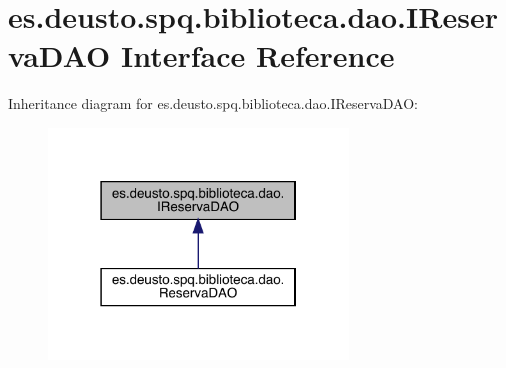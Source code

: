 \hypertarget{interfacees_1_1deusto_1_1spq_1_1biblioteca_1_1dao_1_1_i_reserva_d_a_o}{}\section{es.\+deusto.\+spq.\+biblioteca.\+dao.\+I\+Reserva\+D\+AO Interface Reference}
\label{interfacees_1_1deusto_1_1spq_1_1biblioteca_1_1dao_1_1_i_reserva_d_a_o}


Inheritance diagram for es.\+deusto.\+spq.\+biblioteca.\+dao.\+I\+Reserva\+D\+AO\+:
\nopagebreak
\begin{figure}[H]
\begin{center}
\leavevmode
\includegraphics[width=226pt]{interfacees_1_1deusto_1_1spq_1_1biblioteca_1_1dao_1_1_i_reserva_d_a_o__inherit__graph}
\end{center}
\end{figure}
